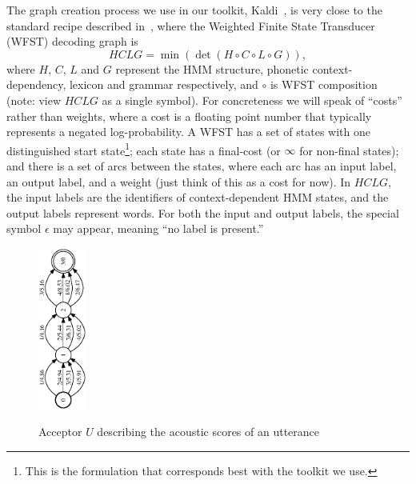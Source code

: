 \documentclass{article}
\def\HCLG{{\mathit{HCLG}}}
\begin{document}
The graph creation process we use in our toolkit, Kaldi~\cite{kaldi_paper},
is very close to the standard recipe described in~\cite{wfst},
where the Weighted Finite State Transducer (WFST) decoding graph is
\begin{equation}
  \HCLG = \min(\det(H \circ C \circ L \circ G)),
\end{equation}
where $H$, $C$, $L$ and $G$ represent the HMM structure, phonetic
context-dependency, lexicon and grammar respectively, 
and $\circ$ is WFST composition (note: view $\HCLG$ as a single symbol).
For concreteness we will speak of ``costs'' rather
than weights, where a cost is a floating point number that typically represents a negated
log-probability.  A WFST has a set of states with one distinguished
start state\footnote{This is the formulation that corresponds best with the toolkit we use.};
each state has a final-cost (or $\infty$ for non-final states);
and there is a set of arcs between the states, where each arc has an
input label, an output label, and a weight
(just think of this as a cost for now).
In $\HCLG$, the input labels are the identifiers of context-dependent
HMM states, and the output labels represent words.  For both the input and output
labels, the special symbol $\epsilon$ may appear, meaning ``no label is present.''


\begin{figure}
\begin{center}
\includegraphics[height=2.1in,angle=270]{figures/acceptor_utterance.eps}
\vspace*{-0.03in}
  \caption{Acceptor $U$ describing the acoustic scores of an utterance}
\vspace*{-0.15in}
\label{fig:acceptor}
\end{center}

\end{figure}
\end{document}
